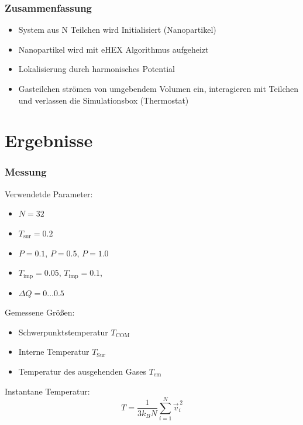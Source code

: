 \documentclass[handout]{beamer}
\begin{document}
\begin{frame}
\frametitle{Zusammenfassung}
\begin{itemize}
\item System aus N Teilchen wird Initialisiert (Nanopartikel)
\item Nanopartikel wird mit eHEX Algorithmus aufgeheizt
\item Lokalisierung durch harmonisches Potential
\item Gasteilchen strömen von umgebendem Volumen ein, interagieren mit Teilchen und verlassen die Simulationsbox (Thermostat)
\end{itemize}
\end{frame}

\section{Ergebnisse}

\begin{frame}
\frametitle{Messung}
Verwendetde Parameter:
\begin{itemize}
\item $N = 32$
\item $T_\text{sur} = 0.2$
\item $P=0.1$, $P=0.5$, $P=1.0$
\item $T_\text{imp} = 0.05$, $T_\text{imp} = 0.1$, 
\item $\Delta Q = 0 \ldots 0.5$
\end{itemize}
Gemessene Größen:
\begin{itemize}
\item Schwerpunktstemperatur $T_\text{COM}$
\item Interne Temperatur $T_\text{Sur}$
\item Temperatur des ausgehenden Gases $T_\text{em}$
\end{itemize}

Instantane Temperatur:
\begin{equation}
    T = \frac{1}{3 k_B N} \sum_{i=1}^N \vec{v}_i^{\, 2}
\end{equation}

\end{frame}
\end{document}
